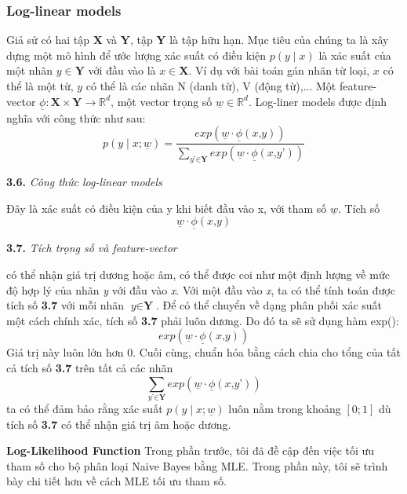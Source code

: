 \subsubsection{Log-linear models}
Giả sử có hai tập $\textbf{X}$ và $\textbf{Y}$, tập \textbf{Y} là tập hữu hạn. Mục tiêu của chúng ta là xây dựng một mô hình để ước lượng xác suất có điều kiện $p(y\mid x)$ là xác suất của một nhãn $y \in \textbf{Y}$ với đầu vào là $x \in \textbf{X}$. Ví dụ với bài toán gán nhãn từ loại, $x$ có thể là một từ, $y$ có thể là các nhãn N (danh từ), V (động từ),... Một feature-vector $\underline{\phi}: \textbf{X} \times \textbf{Y} \longrightarrow \mathbb{R}^d $, một vector trọng số $\underline{w} \in \mathbb{R}^{d}$. Log-liner models được định nghĩa với công thức như sau:
$$p(y \mid x; \underline{w}) = \frac{exp(\underline{w} \cdot \underline{\phi}(\textit{x,y}))}{\sum_{\textit{y'} \in \textbf{Y}} exp(\underline{w} \cdot \underline{\phi}(\textit{x,y'}))} $$
\begin{center}

\vspace{0.3cm}
\textbf{3.6.} \textit{Công thức log-linear models}    
\end{center}
Đây là xác suất có điều kiện của y khi biết đầu vào x, với tham số $\underline{w}$.
Tích số 
$$\underline{w}\cdot \underline{\phi}(\textit{x,y})$$
\begin{center}

\vspace{0.3cm}
\textbf{3.7.} \textit{Tích trọng số và feature-vector}    
\end{center}
có thể nhận giá trị dương hoặc âm, có thể được coi như một định lượng về mức độ hợp lý của nhãn \textit{y} với đầu vào \textit{x}. Với một đầu vào \textit{x}, ta có thể tính toán được tích số \textbf{3.7} với mỗi nhãn $\textit{y} \in \textbf{Y}$. Để có thể chuyển về dạng phân phối xác suất một cách chính xác, tích số \textbf{3.7} phải luôn dương. Do đó ta sẽ sử dụng hàm exp():
$$exp(\underline{w}\cdot \underline{\phi}(\textit{x,y}))$$
Giá trị này luôn lớn hơn 0. Cuối cùng, chuẩn hóa bằng cách chia cho tổng của tất cả tích số \textbf{3.7} trên tất cả các nhãn
$$\sum_{\textit{y'} \in \textbf{Y}} exp(\underline{w} \cdot \underline{\phi}(\textit{x,y'}))$$
ta có thể đảm bảo rằng xác suất  $p(y \mid x; \underline{w})$ luôn nằm trong khoảng $[0;1]$ dù tích số \textbf{3.7} có thể nhận giá trị âm hoặc dương.

\textbf{Log-Likelihood Function}
Trong phần trước, tôi đã đề cập đến việc tối ưu tham số cho bộ phân loại Naive Bayes bằng MLE. Trong phần này, tôi sẽ trình bày chi tiết hơn về cách MLE tối ưu tham số.


